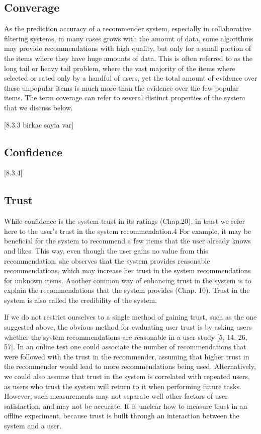 \subsection{Converage}

As the prediction accuracy of a recommender system, especially in collaborative filtering systems, in many cases grows with the amount of data, some algorithms may provide recommendations with high quality, but only for a small portion of the items where they have huge amounts of data. This is often referred to as the long tail or heavy tail problem, where the vast majority of the items where selected or rated only by a handful of users, yet the total amount of evidence over these unpopular items is much more than the evidence over the few popular items.
The term coverage can refer to several distinct properties of the system that we discuss below.

[8.3.3 birkac sayfa var]

\subsection{Confidence}
[8.3.4]

\subsection{Trust}

While confidence is the system trust in its ratings (Chap.20), in trust we refer here to the user’s trust in the system recommendation.4 For example, it may be beneficial for the system to recommend a few items that the user already knows and likes. This way, even though the user gains no value from this recommendation, she observes that the system provides reasonable recommendations, which may increase her trust in the system recommendations for unknown items. Another common way of enhancing trust in the system is to explain the recommendations that the system provides (Chap. 10). Trust in the system is also called the credibility of the system. 

If we do not restrict ourselves to a single method of gaining trust, such as the one suggested above, the obvious method for evaluating user trust is by asking users whether the system recommendations are reasonable in a user study [5, 14, 26, 57]. In an online test one could associate the number of recommendations that were followed with the trust in the recommender, assuming that higher trust in the recommender would lead to more recommendations being used. Alternatively, we could also assume that trust in the system is correlated with repeated users, as users who trust the system will return to it when performing future tasks. However, such measurements may not separate well other factors of user satisfaction, and may not be accurate. It is unclear how to measure trust in an offline experiment, because trust is built through an interaction between the system and a user.

